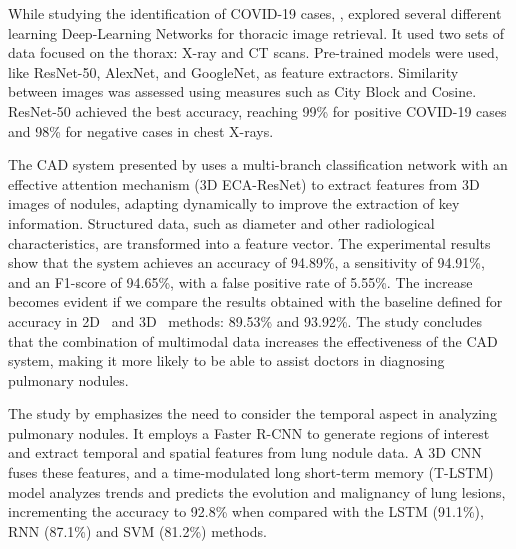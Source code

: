 While studying the identification of COVID-19 cases, \citet{Mahmoud2022}, explored several different learning Deep-Learning Networks for thoracic image retrieval. It used two sets of data focused on the thorax: X-ray and  CT scans. Pre-trained models were used, like ResNet-50, AlexNet, and GoogleNet, as feature extractors. Similarity between images was assessed using measures such as City Block and Cosine. ResNet-50 achieved the best accuracy, reaching 99\% for positive COVID-19 cases and 98\% for negative cases in chest X-rays. 


 


The CAD system presented by \citet{Yuan2022} uses a multi-branch classification network with an effective attention mechanism (3D ECA-ResNet) to extract features from 3D images of nodules, adapting dynamically to improve the extraction of key information. Structured data, such as diameter and other radiological characteristics, are transformed into a feature vector. The experimental results show that the system achieves an accuracy of 94.89\%, a sensitivity of 94.91\%, and an F1-score of 94.65\%, with a false positive rate of 5.55\%. The increase becomes evident if we compare the results obtained with the baseline defined for accuracy in 2D~\cite{Xie2018} and 3D~\cite{Zhao2020} methods: 	
89.53\% and 93.92\%. The study concludes that the combination of multimodal data increases the effectiveness of the CAD system, making it more likely to be able to assist doctors in diagnosing pulmonary nodules.

The study by \citet{Liu2022} emphasizes the need to consider the temporal aspect in analyzing pulmonary nodules. It employs a Faster R-CNN to generate regions of interest and extract temporal and spatial features from lung nodule data. A 3D CNN fuses these features, and a time-modulated long short-term memory (T-LSTM) model analyzes trends and predicts the evolution and malignancy of lung lesions, incrementing the accuracy to 92.8\% when compared with the LSTM (91.1\%), RNN (87.1\%) and SVM (81.2\%) methods.


